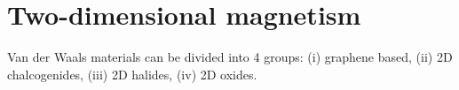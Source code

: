 \chapter{Two-dimensional magnetism}
Van der Waals materials can be divided into 4 groups: (i) graphene based, (ii) 2D chalcogenides, (iii) 2D halides, (iv) 2D oxides.